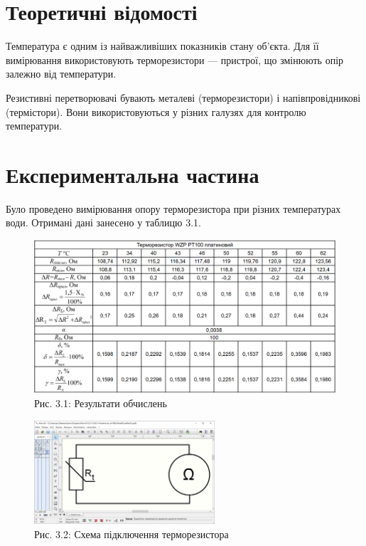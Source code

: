 \documentclass[a4paper]{article}
\begin{document}
\newpage 

\section*{Теоретичні відомості}
Температура є одним із найважливіших показників стану об'єкта. Для її вимірювання використовують терморезистори — пристрої, що змінюють опір залежно від температури.

Резистивні перетворювачі бувають металеві (терморезистори) і напівпровідникові (термістори). Вони використовуються у різних галузях для контролю температури.

\section*{Експериментальна частина}
Було проведено вимірювання опору терморезистора при різних температурах води. Отримані дані занесено у таблицю 3.1.

\begin{figure}[h]
    \centering
    \includegraphics[width=1\textwidth]{imgs/LW3.1.png}
    \caption*{Рис. 3.1: Результати обчислень}
\end{figure} 

\begin{figure}[h]
    \centering
    \includegraphics[width=0.6\textwidth]{imgs/LW3.2.png}
    \caption*{Рис. 3.2: Схема підключення терморезистора}
\end{figure} 
\end{document}
